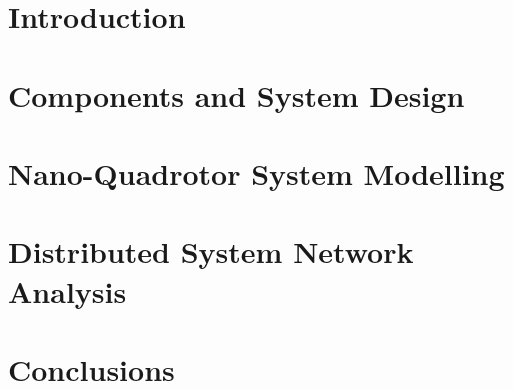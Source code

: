 \documentclass[a4paper, 11pt, twoside]{report}
\begin{document}
\pagestyle{}


%


\chapter{Introduction}

\newpage

\chapter{Components and System Design}









\newpage

%

\newpage

\chapter{Nano-Quadrotor System Modelling}
\label{chapter:modelling}


\chapter{Distributed System Network Analysis}
\label{chapter:network}


\chapter{Conclusions}




\end{document}
